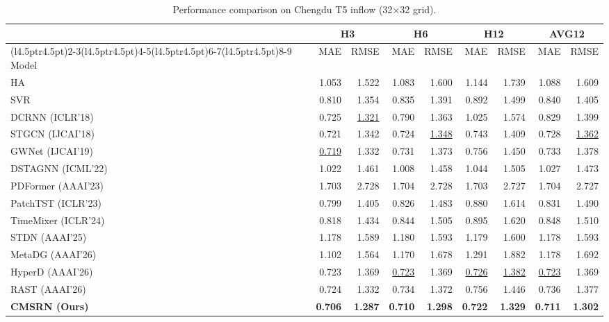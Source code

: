 \begin{table}[!t]
\centering
\caption{Performance comparison on Chengdu T5 inflow (32$\times$32 grid).}
\label{tab:chengdu-inflow}
\begingroup
\fontsize{9}{11}\selectfont
\setlength{\tabcolsep}{4.5pt}
\renewcommand{\arraystretch}{1.12}
\begin{tabular*}{\linewidth}{@{\extracolsep{\fill}}l*{8}{r}@{}}
\toprule
& \multicolumn{2}{c}{H3} & \multicolumn{2}{c}{H6} & \multicolumn{2}{c}{H12} & \multicolumn{2}{c}{AVG12} \\
\cmidrule(l{4.5pt}r{4.5pt}){2-3}\cmidrule(l{4.5pt}r{4.5pt}){4-5}\cmidrule(l{4.5pt}r{4.5pt}){6-7}\cmidrule(l{4.5pt}r{4.5pt}){8-9}
Model & MAE & RMSE & MAE & RMSE & MAE & RMSE & MAE & RMSE \\
\midrule
HA & 1.053 & 1.522 & 1.083 & 1.600 & 1.144 & 1.739 & 1.088 & 1.609 \\
SVR & 0.810 & 1.354 & 0.835 & 1.391 & 0.892 & 1.499 & 0.840 & 1.405 \\
DCRNN (ICLR'18) & 0.725 & \underline{1.321} & 0.790 & 1.363 & 1.025 & 1.574 & 0.829 & 1.399 \\
STGCN (IJCAI'18) & 0.721 & 1.342 & 0.724 & \underline{1.348} & 0.743 & 1.409 & 0.728 & \underline{1.362} \\
GWNet (IJCAI'19) & \underline{0.719} & 1.332 & 0.731 & 1.373 & 0.756 & 1.450 & 0.733 & 1.378 \\
DSTAGNN (ICML'22) & 1.022 & 1.461 & 1.008 & 1.458 & 1.044 & 1.505 & 1.027 & 1.473 \\
PDFormer (AAAI'23) & 1.703 & 2.728 & 1.704 & 2.728 & 1.703 & 2.727 & 1.704 & 2.727 \\
PatchTST (ICLR'23) & 0.799 & 1.405 & 0.826 & 1.483 & 0.880 & 1.614 & 0.831 & 1.490 \\
TimeMixer (ICLR'24) & 0.818 & 1.434 & 0.844 & 1.505 & 0.895 & 1.620 & 0.848 & 1.510 \\
STDN (AAAI'25) & 1.178 & 1.589 & 1.180 & 1.593 & 1.179 & 1.600 & 1.178 & 1.593 \\
MetaDG (AAAI'26) & 1.102 & 1.564 & 1.170 & 1.678 & 1.291 & 1.882 & 1.178 & 1.692 \\
HyperD (AAAI'26) & 0.723 & 1.369 & \underline{0.723} & 1.369 & \underline{0.726} & \underline{1.382} & \underline{0.723} & 1.369 \\
RAST (AAAI'26) & 0.724 & 1.332 & 0.734 & 1.372 & 0.756 & 1.446 & 0.736 & 1.377 \\
\midrule
\textbf{CMSRN (Ours)} & \textbf{0.706} & \textbf{1.287} & \textbf{0.710} & \textbf{1.298} & \textbf{0.722} & \textbf{1.329} & \textbf{0.711} & \textbf{1.302} \\
\bottomrule
\end{tabular*}
\endgroup
\end{table}

